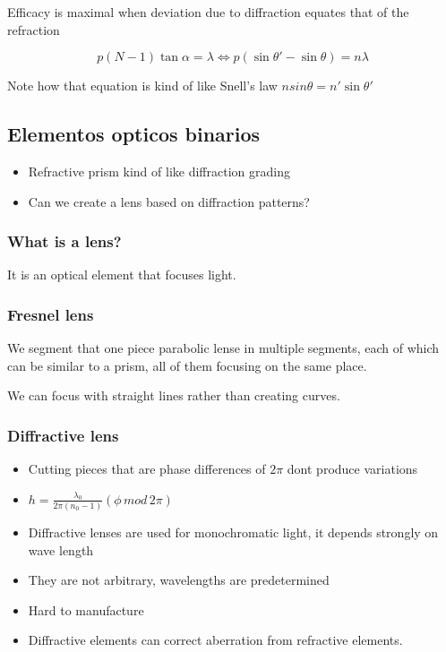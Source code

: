 \documentclass[../main/main.tex]{subfiles}
\begin{document}
Efficacy is maximal when deviation due to diffraction equates that of the refraction

\begin{equation}
p (N-1) \tan \alpha = \lambda \iff p (\sin \theta' -\sin \theta) = n \lambda
\end{equation}

Note how that equation is kind of like Snell's law $n sin \theta = n' \sin \theta ' $


\subsection{Elementos opticos binarios}

\begin{itemize}
	\item Refractive prism kind of like diffraction grading
	\item Can we create a lens based on diffraction patterns?

\end{itemize}

\subsubsection{What is a lens?}

It is an optical element that focuses light.

\subsubsection{Fresnel lens}

We segment that one piece parabolic lense in multiple segments, each of which can be similar to a prism, all of them focusing on the same place.

We can focus with straight lines rather than creating curves.

\subsubsection{Diffractive lens}

\begin{itemize}
	\item Cutting pieces that are phase differences of $2\pi$ dont produce variations
	\item $h = \frac{\lambda_{0}}{2\pi (n_{0} - 1)} (\phi\, mod \,2\pi)$
	\item Diffractive lenses are used for monochromatic light, it depends strongly on wave length
	\item They are not arbitrary, wavelengths are predetermined
	\item Hard to manufacture
	\item Diffractive elements can correct aberration from refractive elements.

\end{itemize}
\end{document}
